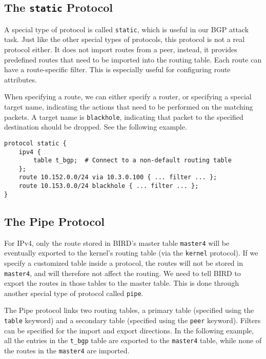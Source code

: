 \subsection{The \texttt{static} Protocol} 
\label{bgp:subsec:static}

A special type of protocol is called \texttt{static}, which is 
useful in our BGP attack task. Just like the other special
types of protocols, this protocol is not a real protocol either.
It does not import routes from a peer, instead, it provides 
predefined routes that need to be imported into 
the routing table. Each route can have a route-specific
filter. This is especially useful for configuring route attributes. 

When specifying a route, we can either specify a router, or 
specifying a special target name, indicating the actions 
that need to be performed on the matching packets. 
A target name is \texttt{blackhole},
indicating that packet to the specified destination should be 
dropped. See the following example.

\begin{lstlisting}
protocol static {
    ipv4 {
        table t_bgp;  # Connect to a non-default routing table
    };
    route 10.152.0.0/24 via 10.3.0.100 { ... filter ... };
    route 10.153.0.0/24 blackhole { ... filter ... };
}
\end{lstlisting}



\subsection{The Pipe Protocol} 

For IPv4, only the route stored in BIRD's master table \texttt{master4} will be eventually
exported to the kernel's routing table (via the \texttt{kernel} protocol). 
If we specify a customized table
inside a protocol, the routes will not be stored in \texttt{master4},
and will therefore not affect the routing. We need to tell BIRD
to export the routes in those tables to the master table. This is done 
through another special type of protocol called \texttt{pipe}. 

The Pipe protocol links two routing tables, a primary table (specified using
the \texttt{table} keyword) and a secondary table (specified using 
the \texttt{peer} keyword). Filters can be specified for the import
and export directions. In the following example, all the entries
in the \texttt{t\_bgp} table are exported to the \texttt{master4} table,
while none of the routes in the \texttt{master4} are imported. 

